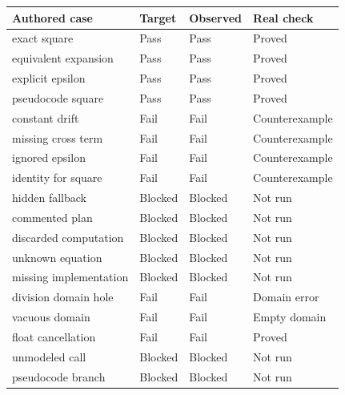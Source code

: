 \begin{tabular}{p{.39\linewidth}lll}
\toprule
Authored case & Target & Observed & Real check \\
\midrule
exact square & Pass & Pass & Proved \\
equivalent expansion & Pass & Pass & Proved \\
explicit epsilon & Pass & Pass & Proved \\
pseudocode square & Pass & Pass & Proved \\
constant drift & Fail & Fail & Counterexample \\
missing cross term & Fail & Fail & Counterexample \\
ignored epsilon & Fail & Fail & Counterexample \\
identity for square & Fail & Fail & Counterexample \\
hidden fallback & Blocked & Blocked & Not run \\
commented plan & Blocked & Blocked & Not run \\
discarded computation & Blocked & Blocked & Not run \\
unknown equation & Blocked & Blocked & Not run \\
missing implementation & Blocked & Blocked & Not run \\
division domain hole & Fail & Fail & Domain error \\
vacuous domain & Fail & Fail & Empty domain \\
float cancellation & Fail & Fail & Proved \\
unmodeled call & Blocked & Blocked & Not run \\
pseudocode branch & Blocked & Blocked & Not run \\
\bottomrule
\end{tabular}
